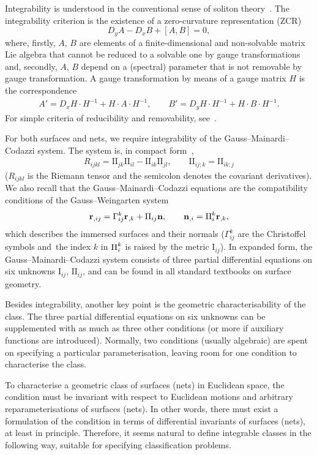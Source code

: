 \documentclass[pdftex]{sigma}
\let\ve\mathbf
\def\I#1#2{\mathrm{I}_{#1#2}}
\def\II#1#2{\mathrm{II}_{#1#2}}
\numberwithin{equation}{section}
\begin{document}
Integrability is understood in the conventional sense of
soliton theory~\cite{Bob,G-T,R-S,Sym}.
The integrability criterion is the existence
of a zero-curvature representation (ZCR)~\cite{Z-S-1974}
\[
D_y A - D_x B + [A, B] = 0,
\]
where, firstly, $A$, $B$ are elements of a finite-dimensional and
non-solvable matrix Lie algebra that cannot be reduced to a solvable
one by gauge transformations and,
secondly, $A$, $B$ depend on a (spectral) parameter that is not removable
by gauge transformation.
A gauge transformation by means of a gauge matrix $H$ is the
correspondence
\begin{gather*}
A' = D_x H \cdot H^{-1} + H \cdot A \cdot H^{-1}, \qquad
B' = D_y H \cdot H^{-1} + H \cdot B \cdot H^{-1}.
\end{gather*}
For simple criteria of reducibility and removability, see~\cite{MM-rzcr,MM-spp}.

For both surfaces and nets, we require integrability of the
Gauss--Mainardi--Codazzi system.
The system is, in compact form~\cite{Spi-III,Sym},
\begin{gather}\label{eq:GMC}
R_{ijkl} = \II jk \II il - \II ik \II jl, \qquad
\mathrm{II}_{ij;k} = \mathrm{II}_{ik;j}
\end{gather}
($R_{ijkl}$ is the Riemann tensor and the semicolon denotes the covariant derivatives).
We also recall that the Gauss--Mainardi--Codazzi equations are the
compatibility conditions of the Gauss--Weingarten system
\begin{gather}\label{eq:GW}
\ve r_{,ij} = \Gamma^k_{ij} \ve r_{,k} + \II ij \ve n,
\qquad
\ve n_{,i} = {\rm II}^k_i \ve r_{,k},
\end{gather}
which describes the immersed surfaces and their normals
($\Gamma^k_{ij}$ are the Christoffel symbols and~the index
$k$ in ${\rm II}^k_i$ is raised by the metric $\I ij$).
%
In expanded form, the Gauss--Mainardi--Codazzi system consists
of three partial differential equations on six unknowns
$\I ij$, $\II ij$, and can be found in all standard textbooks on surface
geometry.

Besides integrability, another key point is the geometric characterisability
of the class.
The three partial differential equations on six unknowns can be supplemented
with as much as three other conditions
(or more if auxiliary functions are introduced).
Normally, two conditions (usually algebraic) are spent on specifying a particular
parameterisation,
leaving room for one condition to characterise the class.

To characterise a geometric class of surfaces (nets) in Euclidean space,
the condition must be invariant with respect to Euclidean motions and arbitrary
reparameterisations of surfaces (nets).
In other words, there must exist a formulation of the condition in terms
of differential invariants of surfaces (nets), at least in principle.
Therefore, it seems natural to define integrable classes in the following way,
suitable for specifying classification problems.
\end{document}
